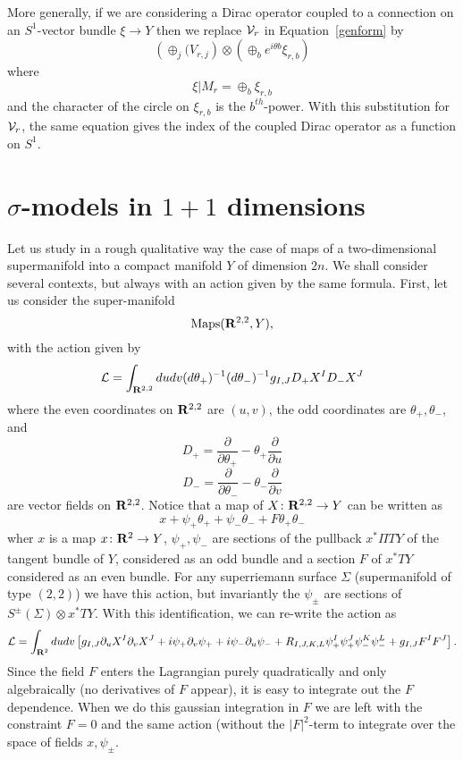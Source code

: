 More generally, if we are considering a Dirac operator coupled to a
connection on an $S^1$-vector bundle $\xi\to Y$ then we replace ${\cal
V}_r$ in Equation~\ref{genform} by 
$$\left(\oplus_j(V_{r,j}\right)\otimes\left(\oplus_be^{i\theta b}
\xi_{r,b}\right)$$  
where
$$\xi|M_r=\oplus_b\xi_{r,b}$$
and the character of the circle on $\xi_{r,b}$ is the $b^{th}$-power. 
With this substitution for ${\cal V}_r$, the same equation gives the
index of the coupled Dirac operator as a function on $S^1$.


\section{$\sigma$-models in $1+1$ dimensions}

Let us study in a rough qualitative way the case of maps of a
two-dimensional supermanifold into  a compact manifold $Y$ of
dimension $2n$.  We shall consider several contexts, but always with an
action given by the same formula.
First, let us
consider the super-manifold 
$${\rm Maps}({\bf R}^{2,2},Y),$$
with the action given by 
$${\cal L}=\int_{{\bf
R}^{2,2}}dudv(d\theta_+)^{-1}(d\theta_-)^{-1}g_{I,J}D_+X^ID_-X^J$$
where the even coordinates on ${\bf R}^{2,2}$ are $(u,v)$, the odd
coordinates are $\theta_+,\theta_-$, and
$$D_+=\frac{\partial}{\partial\theta_+}-\theta_+\frac{\partial}{\partial
u}$$
$$D_-=\frac{\partial}{\partial\theta_-}-\theta_-\frac{\partial}{\partial
v}$$
are vector fields on ${\bf R}^{2,2}$.
Notice that  a map of $X\colon {\bf R}^{2,2}\to Y$ 
can be written as
$$x+\psi_+\theta_++\psi_-\theta_-+F\theta_+\theta_-$$
wher $x$ is  a map
$x\colon {\bf R}^2\to Y$, $\psi_+,\psi_-$ are sections of the
pullback $x^*\Pi TY$ of the  tangent bundle of $Y$, considered as an
odd bundle and a section $F$ of $x^*TY$ considered as an even bundle.
For any superriemann surface $\Sigma$ (supermanifold of type
$(2,2)$) we have this action, but invariantly the $\psi_\pm$ are
sections  of
$S^\pm(\Sigma)\otimes x^*TY$. 
With this identification,
we can re-write the action as
$${\cal L}=\int_{{\bf
R}^2}dudv\left[g_{I,J}\partial_uX^I\partial_vX^J+i\psi_+\partial_v
\psi_++i\psi_-\partial_u\psi_-+
R_{I,J,K,L}\psi_+^I\psi_+^J\psi_-^K\psi_-^L+g_{I,J}F^IF^J\right].$$ 
Since the field $F$ enters the Lagrangian purely quadratically and
only algebraically (no derivatives of $F$ appear), it is easy to
integrate out the $F$ dependence.  When we do this gaussian
integration in $F$ we are left with the constraint $F=0$ and the same
action (without the $|F|^2$-term to integrate over the space  of
fields $x,\psi_\pm$. 

